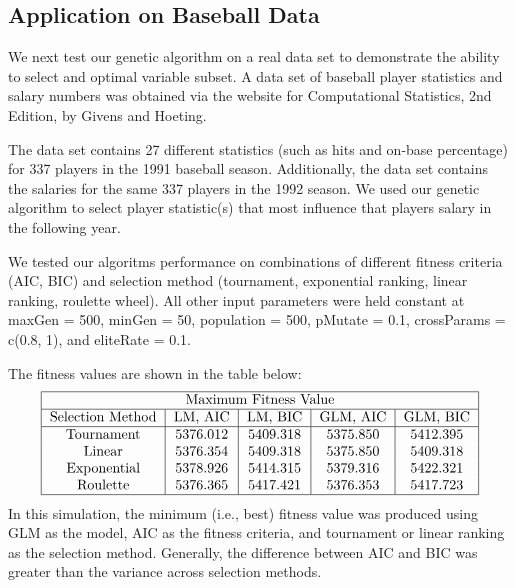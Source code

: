 \documentclass{article}
\begin{document}

\subsection{Application on Baseball Data}
We next test our genetic algorithm on a real data set to demonstrate the ability to select and optimal variable subset.  A data set of baseball player statistics and salary numbers was obtained via the website for Computational Statistics, 2nd Edition, by Givens and Hoeting.

The data set contains 27 different statistics (such as hits and on-base percentage) for 337 players in the 1991 baseball season.  Additionally, the data set contains the salaries for the same 337 players in the 1992 season.  We used our genetic algorithm to select player statistic(s) that most influence that players salary in the following year.

We tested our algoritms performance on combinations of different fitness criteria (AIC, BIC) and selection method (tournament, exponential ranking, linear ranking, roulette wheel).  All other input parameters were held constant at maxGen = 500, minGen = 50, population = 500, pMutate = 0.1, crossParams = c(0.8, 1), and  eliteRate = 0.1.


The fitness values are shown in the table below:
$$
\begin{tabular}{ |c|c|c|c|c|  }
 \hline
 \multicolumn{5}{|c|}{Maximum Fitness Value} \\
 \hline
 Selection Method & LM, AIC & LM, BIC & GLM, AIC & GLM, BIC\\
 \hline
 Tournament &  5376.012   & 5409.318 & 5375.850  & 5412.395\\
 Linear & 5376.354 & 5409.318  & 5375.850 & 5409.318\\
 Exponential & 5378.926 & 5414.315 & 5379.316 & 5422.321\\
 Roulette   & 5376.365 & 5417.421 & 5376.353 & 5417.723\\
 \hline
\end{tabular}
$$
In this simulation, the minimum (i.e., best) fitness value was produced using GLM as the model, AIC as the fitness criteria, and tournament or linear ranking as the selection method.  Generally, the difference between AIC and BIC was greater than the variance across selection methods.
\end{document}
